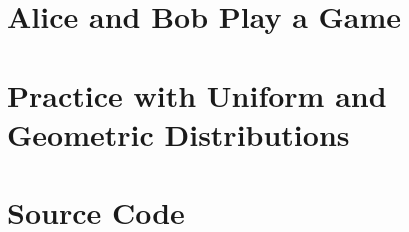 \documentclass[twocolumn]{article}
\begin{document}
\section{Alice and Bob Play a Game}
\lipsum[1] %

\section{Practice with Uniform and Geometric Distributions}
\lipsum[1] %

\section{Source Code}
\lipsum[1] %


%
%
\end{document}
